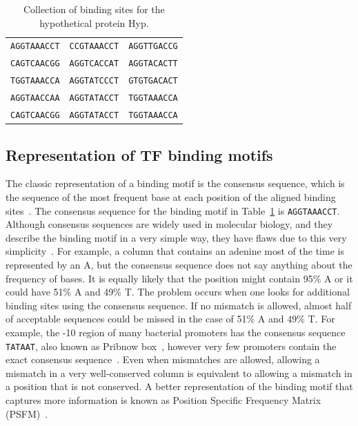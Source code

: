 \begin{table}[h]
  \centering
  \caption{Collection of binding sites for the hypothetical protein Hyp.}
  \label{tab:lexa-motif}
  \begin{tabular}{c c c}
\texttt{AGGTAAACCT} & \texttt{CCGTAAACCT} & \texttt{AGGTTGACCG}\\
\texttt{CAGTCAACGG} & \texttt{AGGTCACCAT} & \texttt{AGGTACACTT}\\
\texttt{TGGTAAACCA} & \texttt{AGGTATCCCT} & \texttt{GTGTGACACT}\\
\texttt{AGGTAACCAA} & \texttt{AGGTATACCT} & \texttt{TGGTAAACCA}\\
\texttt{CAGTCAACGG} & \texttt{AGGTATACCT} & \texttt{TGGTAAACCA}
   \end{tabular}
\end{table}


\subsection{Representation of TF binding motifs}

The classic representation of a binding motif is the consensus sequence, which
is the
sequence of the most frequent base at each position of the aligned binding
sites~\citep{pierce2012genetics}. The consensus sequence for the binding motif
in Table~\ref{tab:lexa-motif} is \texttt{AGGTAAACCT}. Although consensus
sequences are widely used in molecular biology, and they describe the binding
motif in a very simple way, they have flaws due to this very
simplicity~\citep{schneider2002consensus}. For example, a column that contains
an adenine most of the time is represented by an A, but the consensus sequence
does not say anything about the frequency of bases. It is equally likely that
the position might contain 95\% A or it could have 51\% A and 49\% T. The
problem occurs when one looks for additional binding sites using the consensus
sequence.  If no mismatch is allowed, almost half of acceptable sequences could
be missed in the case of 51\% A and 49\% T. For example, the -10 region of many
bacterial promoters has the consensus sequence \texttt{TATAAT}, also known as
Pribnow box~\citep{pribnow1975nucleotide}, however very few promoters
contain the exact consensus sequence~\citep{lisser1993compilation}. Even when
mismatches are allowed, allowing a mismatch in a very well-conserved column
is equivalent to allowing a mismatch in a position that is not
conserved. A better representation of the binding motif that captures more
information is known as Position Specific Frequency Matrix (PSFM)~\citep{stormo2000dna}.

